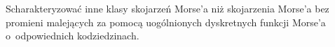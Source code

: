\begin{problem}\label{prob7}
Scharakteryzować inne klasy skojarzeń Morse'a niż skojarzenia Morse'a bez promieni malejących za pomocą uogólnionych dyskretnych funkcji Morse'a o~odpowiednich kodziedzinach.
\end{problem}

\begin{comment}
Jeżeli natomiast rozważać chcemy uogólnione dyskretne funkcje Morse'a indukujące dowolne skojarzenia Morse'a, to interesującym kandydatem na kodziedzinę dyskretnej funkcji Morse'a wydają się być produkty leksykograficzne postaci $P(\alpha^d,\alpha)$, gdzie $\alpha$ jest dobrym porządkiem. Ma bowiem miejsce następujący fakt.

\begin{stw}
Niech $P$~będzie dobrze ufundowanym częściowym porządkiem nie zawierającym podzbioru izomorficznego z~$\omega\oplus 1$. Niech $M$~będzie skojarzeniem na grafie skierownym $\mH(P)$. Następujące warunki są równoważne.
\begin{compactenum}
\item Skojarzenie $M$~jest skojarzeniem Morse'a na~$P$.
\item Istnieje indukująca skojarzenie $M$~uogólniona dyskretna funkcja Morse'a na $P$~o~wartościach w~pewnym produkcie leksykograficznym $\Lex(\alpha^d,\alpha)$, gdzie $\alpha$ jest dobrym porządkiem.
\item Istnieje indukująca skojarzenie $M$~różnowartościowa uogólniona dyskretna funkcja Morse'a na $P$~o~wartościach w~pewnym produkcie leksykograficznym $\Lex(\alpha^d,\alpha)$, gdzie $\alpha$ jest dobrym porządkiem.
\end{compactenum}
\end{stw}
\begin{proof}

\end{proof}

Dla uogólnionej dyskretnej funkcji Morse'a $f\colon P\to L$ oraz $l\in L$ definiujemy podzbiór częściowo uporządkowany $P_l\subseteq P$ wzorem \[P_l=\bigcup_{f(p)<l}p\mathord{\downarrow}.\] Prawdziwy jest następujący odpowiednik twierdzenia \ref{tw-formana_o_homotopijnej_rownowaznosci_miedzy_poziomami}.

\begin{tw}
Niech $\alpha$~będzie pewnym dobrym porządkiem, zaś $f\colon P\to \Lex(\alpha^d,\alpha)$ uogólnioną dyskretną funkcją Morse'a na h-regularnym częściowym porządku $P$. Jeżeli $l,l'\in \Lex(\alpha^d,\alpha)$ są takie, że  $l<l'$ oraz nie istnieje element krytyczny $p\in P$ taki, że $l< f(p)\leq l'$, to kompleks $\mK(P_l)$ jest mocnym retraktem deformacyjnym kompleksu $\mK(P_{l'})$.
\end{tw}
\begin{proof}

\end{proof}

Odnotujmy jedynie, że możliwe są różnorakie uogólnienia powyższego wyniku, którymi jednak nie chcemy się w~tej chwili zajmować.
\end{comment}

